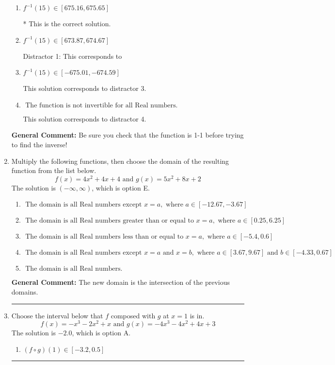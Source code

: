 \documentclass{extbook}[14pt]
\newcommand{\litem}[1]{\item #1

\rule{\textwidth}{0.4pt}}
\begin{document}
\begin{enumerate}
{\begin{enumerate}[label=\Alph*.]
 This solution corresponds to distractor 2.
\item \( f^{-1}(15) \in [675.16, 675.65] \)

* This is the correct solution.
\item \( f^{-1}(15) \in [673.87, 674.67] \)

 Distractor 1: This corresponds to 
\item \( f^{-1}(15) \in [-675.01, -674.59] \)

 This solution corresponds to distractor 3.
\item \( \text{ The function is not invertible for all Real numbers. } \)

 This solution corresponds to distractor 4.
\end{enumerate}

\textbf{General Comment:} Be sure you check that the function is 1-1 before trying to find the inverse!
}
\litem{
Multiply the following functions, then choose the domain of the resulting function from the list below.
\[ f(x) = 4x^{2} +4 x + 4 \text{ and } g(x) = 5x^{2} +8 x + 2 \]The solution is \( (-\infty, \infty) \), which is option E.\begin{enumerate}[label=\Alph*.]
\item \( \text{ The domain is all Real numbers except } x = a, \text{ where } a \in [-12.67, -3.67] \)


\item \( \text{ The domain is all Real numbers greater than or equal to } x = a, \text{ where } a \in [0.25, 6.25] \)


\item \( \text{ The domain is all Real numbers less than or equal to } x = a, \text{ where } a \in [-5.4, 0.6] \)


\item \( \text{ The domain is all Real numbers except } x = a \text{ and } x = b, \text{ where } a \in [3.67, 9.67] \text{ and } b \in [-4.33, 0.67] \)


\item \( \text{ The domain is all Real numbers. } \)


\end{enumerate}

\textbf{General Comment:} The new domain is the intersection of the previous domains.
}
\litem{
Choose the interval below that $f$ composed with $g$ at $x=1$ is in.
\[ f(x) = -x^{3} -2 x^{2} +x \text{ and } g(x) = -4x^{3} -4 x^{2} +4 x + 3 \]The solution is \( -2.0 \), which is option A.\begin{enumerate}[label=\Alph*.]
\item \( (f \circ g)(1) \in [-3.2, 0.5] \)


\end{enumerate}}
\end{enumerate}
\end{document}
